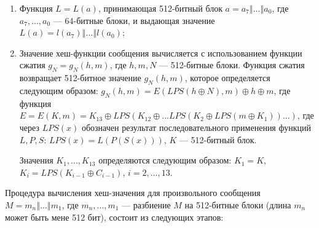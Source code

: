 \documentclass{./civarticle}
\begin{document}
\begin{enumerate}
    \item Функция $L = L(a)$, принимающая 512-битный блок $a = a_{7} \mathbin\Vert ... \mathbin\Vert a_0$, где $a_{7}, ..., a_0$ --- 64-битные блоки, и выдающая значение $L(a) = l(a_{7}) \mathbin\Vert ... \mathbin\Vert l(a_0)$;

    \item Значение хеш-функции сообщения вычисляется с использованием функции сжатия $g_N = g_N(h, m)$, где $h, m, N$ --- 512-битные блоки. Функция сжатия возвращает 512-битное значение $g_N(h, m)$, которое определяется следующим образом: $g_N(h, m) = E(LPS(h \oplus N), m) \oplus h \oplus m$, где функция $E = E(K, m) = K_{13} \oplus LPS(K_{12} \oplus ... LPS(K_2 \oplus LPS(m \oplus K_1))...)$, где через $LPS(x)$ обозначен результат последовательного применения функций $L, P, S$: $LPS(x) = L(P(S(x)))$, $K$ --- 512-битный блок.

    Значения $K_1, ..., K_{13}$ определяются следующим образом: $K_1 = K$, $K_i = LPS(K_{i-1} \oplus C_{i-1})$, $i = 2, ..., 13$.
    
\end{enumerate}

Процедура вычисления хеш-значения для произвольного сообщения $M = m_n \mathbin\Vert ... \mathbin\Vert m_1$, где $m_n, ..., m_1$ --- разбиение $M$ на 512-битные блоки (длина $m_n$ может быть мене 512 бит), состоит из следующих этапов:
\end{document}

